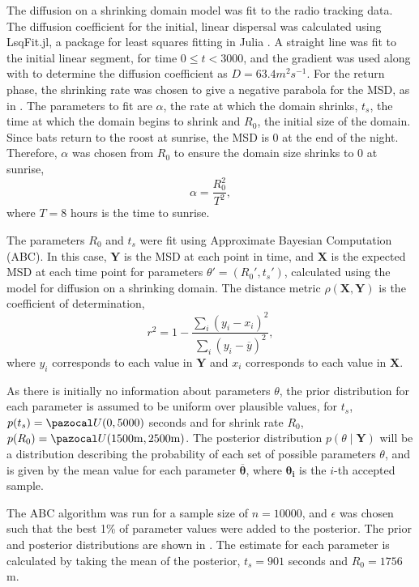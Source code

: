 The diffusion on a shrinking domain model was fit to the radio tracking data. The diffusion coefficient for the initial, linear dispersal was calculated using
LsqFit.jl, a package for least squares fitting in Julia \cite{LsqFit}. A
straight line was fit to the initial linear segment, for time $0 \leq t < 3000$, and the gradient was used
along with  to determine the diffusion coefficient as $D
= 63.4 m^2s^{-1}$. For the return phase, the shrinking rate was chosen to give a negative parabola for the MSD, as in . The parameters to fit are $\alpha$, the rate at which the domain shrinks,
$t_s$, the time at which the domain begins to shrink and $R_0$, the initial size
of the domain. Since bats return to the roost at sunrise, the MSD is 0 at the end of the night. Therefore, $\alpha$ was chosen from $R_0$ to ensure the domain size shrinks to 0 at sunrise,
%
\begin{equation}
\alpha = \frac{R_0^2}{T^2},
\end{equation}
%
where $T = 8 $ hours is the time to sunrise.

 The parameters $R_0$ and $t_s$ were fit using Approximate Bayesian Computation (ABC). In this case, $\bm{Y}$ is the MSD at each point in time, and $\bm{X}$ is the expected MSD at each time
point for parameters $\theta' = (R_0',t_s') $, calculated using the model for
diffusion on a shrinking domain. The distance metric $\rho(\bm{X},\bm{Y})$ is the coefficient of determination,
%
\begin{equation}
r^2 = 1 - \frac{\sum_i(y_i - x_i)^2 }{\sum_i (y_i - \overline{y})^2},
\end{equation}
%
where $y_i$ corresponds to each value in $\bm{Y}$ and $x_i$ corresponds to each value in $\bm{X}$.

As there is initially no information about parameters $\theta$, the prior distribution for each parameter is assumed to be uniform over plausible values, for $t_s$, $p(t_s) = \unif(0,5000)$ seconds and for shrink rate $R_0$, $p(R_0) = \unif(1500\mathrm{m},2500\mathrm{m})$. The posterior distribution $ p(\theta \mid \bm{Y})$ will be a distribution describing the probability of each set of possible parameters $\theta$, and is given by the mean value for each parameter $\overline{\bm{\theta}}$, where $\bm{\theta_i}$ is the $i$-th accepted sample.

The ABC algorithm was run for a sample size of $n = 10000$, and $\epsilon$ was chosen such that the best 1\% of parameter values were added to the posterior. The prior and posterior distributions are shown in . The estimate for each parameter is calculated by taking the mean of the posterior, $t_s = 901$ seconds and $R_0 = 1756$m.

